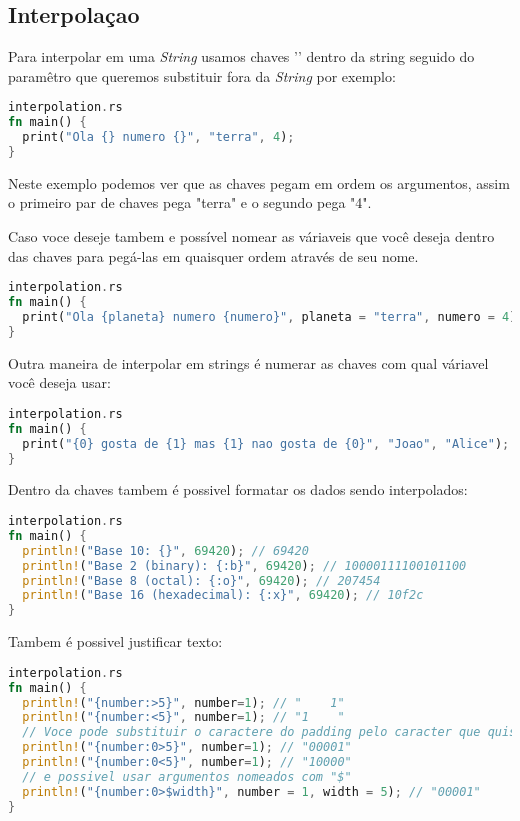 \pagebreak
\newpage

\subsection{Interpola\c{c}ao}

Para interpolar em uma \textit{String} usamos chaves '{}' dentro da string seguido do paramêtro que queremos substituir fora da \textit{String} por exemplo:

\begin{lstlisting}[language=rust]
interpolation.rs
fn main() {
  print("Ola {} numero {}", "terra", 4);
}
\end{lstlisting}

Neste exemplo podemos ver que as chaves pegam em ordem os argumentos, assim o primeiro par de chaves pega "terra" e o segundo pega "4".

Caso voce deseje tambem e possível nomear as váriaveis que você deseja dentro das chaves para pegá-las em quaisquer ordem através de seu nome.

\begin{lstlisting}[language=rust]
interpolation.rs
fn main() {
  print("Ola {planeta} numero {numero}", planeta = "terra", numero = 4);
}
\end{lstlisting}

Outra maneira de interpolar em strings é numerar as chaves com qual váriavel você deseja usar:

\begin{lstlisting}[language=rust]
interpolation.rs
fn main() {
  print("{0} gosta de {1} mas {1} nao gosta de {0}", "Joao", "Alice");
}
\end{lstlisting}

Dentro da chaves tambem é possivel formatar os dados sendo interpolados:

\begin{lstlisting}[language=rust]
interpolation.rs
fn main() {
  println!("Base 10: {}", 69420); // 69420
  println!("Base 2 (binary): {:b}", 69420); // 10000111100101100
  println!("Base 8 (octal): {:o}", 69420); // 207454
  println!("Base 16 (hexadecimal): {:x}", 69420); // 10f2c
}
\end{lstlisting}

Tambem é possivel justificar texto:

\begin{lstlisting}[language=rust]
interpolation.rs
fn main() {
  println!("{number:>5}", number=1); // "    1"
  println!("{number:<5}", number=1); // "1    "
  // Voce pode substituir o caractere do padding pelo caracter que quiser:
  println!("{number:0>5}", number=1); // "00001"
  println!("{number:0<5}", number=1); // "10000"
  // e possivel usar argumentos nomeados com "$"
  println!("{number:0>$width}", number = 1, width = 5); // "00001"
}
\end{lstlisting}


